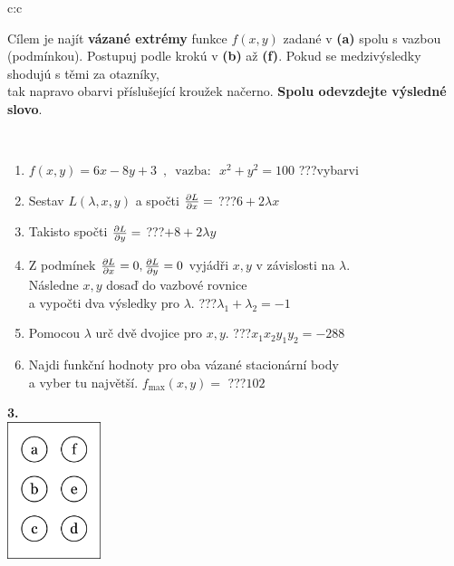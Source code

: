 \documentclass[10pt]{report}
\begin{document}
\begin{tabular}{c:c}
\begin{minipage}[c][104.5mm][t]{0.5\linewidth}
\begin{center}
\begin{minipage}{0.95\linewidth}
\begin{center}
Cílem je najít \textbf{vázané extrémy} funkce $f(x,y)$ zadané v \textbf{(a)} spolu s vazbou (podmínkou). Postupuj podle krokú v \textbf{(b)} až \textbf{(f)}. Pokud se medzivýsledky shodujú s těmi za otazníky,\\tak napravo obarvi příslušející kroužek načerno. \textbf{Spolu odevzdejte výsledné slovo}.
\end{center}
\end{minipage}
\\[1mm]
\begin{minipage}{0.79\linewidth}
\begin{center}
\begin{varwidth}{\linewidth}
\begin{enumerate}
\normalsize
\item $f(x,y)=6x-8y+3 \enspace , \enspace \mathrm{vazba:} \enspace x^2+y^2=100$\quad \dotfill\; ???\;\dotfill \quad vybarvi
\item Sestav $L(\lambda,x,y)$ a spočti $\pdv{L}{x}=$\quad \dotfill\; ???\;\dotfill \quad $6+2\lambda x$
\item Takisto spočti $\pdv{L}{y}=$\quad \dotfill\; ???\;\dotfill \quad $+8+2\lambda y$
\item Z podmínek $\pdv{L}{x}=0 , \pdv{L}{y}=0$ vyjádři $x,y$ v závislosti na $\lambda$.\\ \phantom{xxxxxx}Následne $x,y$ dosaď do vazbové rovnice\\ \phantom{xxxxxx}a vypočti dva výsledky pro $\lambda$.\quad \dotfill\; ???\;\dotfill \quad $\lambda_1+\lambda_2=-1$
\item Pomocou $\lambda$ urč dvě dvojice pro $x,y$.\quad \dotfill\; ???\;\dotfill \quad $x_1 x_2 y_1 y_2=-288$
\item Najdi funkční hodnoty pro oba vázané stacionární body\\ \phantom{xxxxxx}a vyber tu najvětší. $f_{\text{max}}(x,y)=$\quad \dotfill\; ???\;\dotfill \quad $102$
\end{enumerate}
\end{varwidth}
\end{center}
\end{minipage}
\begin{minipage}{0.20\linewidth}
\begin{center}
{\Huge\bfseries 3.} \\[2mm]
\includegraphics[height=40mm]{../images/braille.png}

\end{center}
\end{minipage}
\end{center}
\end{minipage}
\end{tabular}
\end{document}

